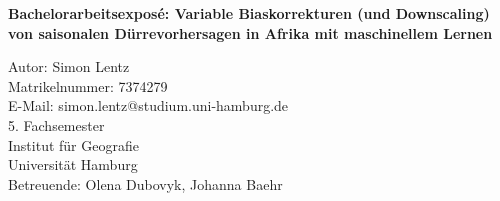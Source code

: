 \documentclass[11pt,a4paper, bibliography=totocnumbered]{scrreport}
\begin{document}
\begin{titlepage}

    \vspace*{5cm}

    \begin{centering}

        \Huge\textbf{Bachelorarbeitsexposé: Variable Biaskorrekturen (und Downscaling) von saisonalen Dürrevorhersagen in Afrika mit maschinellem Lernen}

    \end{centering}

    \vspace*{6cm}

    \noindent Autor: Simon Lentz \\
    Matrikelnummer: 7374279 \\
    E-Mail: simon.lentz@studium.uni-hamburg.de \\
    5. Fachsemester \\
    Institut für Geografie \\
    Universität Hamburg \\
    Betreuende: Olena Dubovyk, Johanna Baehr




    \vspace{1cm}

\end{titlepage}


\newpage
\begin{doublespacing}
    \tableofcontents
\end{doublespacing}

\thispagestyle{empty}
\addtocounter{page}{-2}
\newpage













\newpage
\printbibliography\newpage


\end{document}
